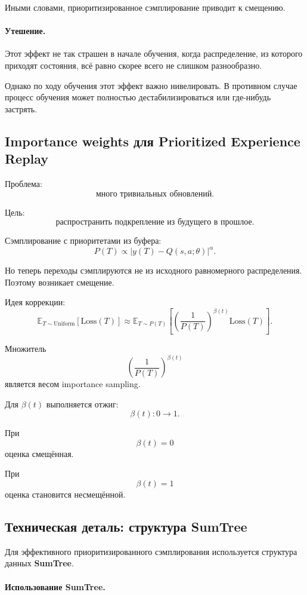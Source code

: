 \documentclass[12pt,a4paper]{article}
\begin{document}
Иными словами, приоритизированное сэмплирование приводит к смещению.

\paragraph{Утешение.}

Этот эффект не так страшен в начале обучения, когда распределение, из которого приходят состояния, всё равно скорее всего не слишком разнообразно.

Однако по ходу обучения этот эффект важно нивелировать. В противном случае процесс обучения может полностью дестабилизироваться или где-нибудь застрять.

\subsection{Importance weights для Prioritized Experience Replay}

Проблема:
\[
\text{много тривиальных обновлений}.
\]

Цель:
\[
\text{распространить подкрепление из будущего в прошлое}.
\]

Сэмплирование с приоритетами из буфера:
\[
P(T)
\propto
\left|
y(T)-Q(s,a;\theta)
\right|^\alpha.
\]

Но теперь переходы сэмплируются не из исходного равномерного распределения. Поэтому возникает смещение.

Идея коррекции:
\[
\mathbb E_{T \sim \mathrm{Uniform}}
\left[
\mathrm{Loss}(T)
\right]
\approx
\mathbb E_{T \sim P(T)}
\left[
\left(
\frac{1}{P(T)}
\right)^{\beta(t)}
\mathrm{Loss}(T)
\right].
\]

Множитель
\[
\left(
\frac{1}{P(T)}
\right)^{\beta(t)}
\]
является весом importance sampling.

Для $\beta(t)$ выполняется отжиг:
\[
\beta(t): 0 \to 1.
\]

При
\[
\beta(t)=0
\]
оценка смещённая.

При
\[
\beta(t)=1
\]
оценка становится несмещённой.

\subsection{Техническая деталь: структура SumTree}

Для эффективного приоритизированного сэмплирования используется структура данных \textbf{SumTree}.

\paragraph{Использование SumTree.}
\end{document}
